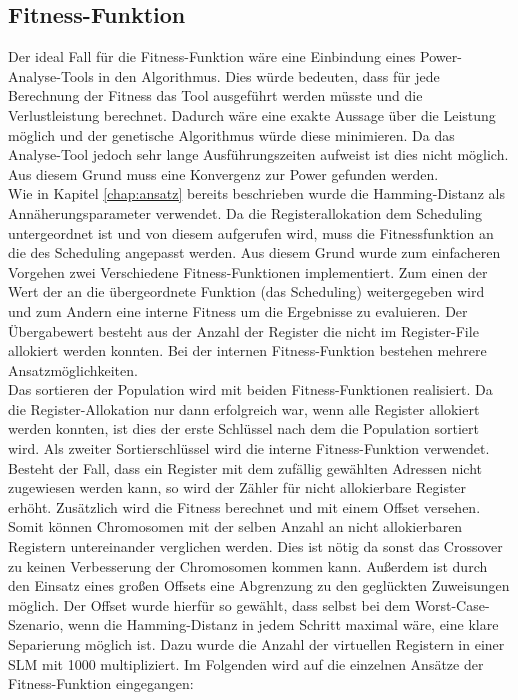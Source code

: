 \subsection{Fitness-Funktion}
\label{chap:Fitness-Funktion}
Der ideal Fall für die Fitness-Funktion wäre eine Einbindung eines Power-Analyse-Tools in den Algorithmus. Dies würde bedeuten, dass für jede Berechnung der Fitness das Tool ausgeführt werden müsste und die Verlustleistung berechnet. Dadurch wäre eine exakte Aussage über die Leistung möglich und der genetische Algorithmus würde diese minimieren. Da das Analyse-Tool jedoch sehr lange Ausführungszeiten aufweist ist dies nicht möglich. Aus diesem Grund muss eine Konvergenz zur Power gefunden werden.\\
Wie in Kapitel \ref{chap:ansatz} bereits beschrieben wurde die Hamming-Distanz als Annäherungsparameter verwendet. Da die Registerallokation dem Scheduling untergeordnet ist und von diesem aufgerufen wird, muss die Fitnessfunktion an die des Scheduling angepasst werden. Aus diesem Grund wurde zum einfacheren Vorgehen zwei Verschiedene Fitness-Funktionen implementiert. Zum einen der Wert der an die übergeordnete Funktion (das Scheduling) weitergegeben wird und zum Andern eine interne Fitness um die Ergebnisse zu evaluieren.
Der Übergabewert besteht aus der Anzahl der Register die nicht im Register-File allokiert werden konnten. Bei der internen Fitness-Funktion bestehen mehrere Ansatzmöglichkeiten.\\
Das sortieren der Population wird mit beiden Fitness-Funktionen realisiert. Da die Register-Allokation nur dann erfolgreich war, wenn alle Register allokiert werden konnten, ist dies der erste Schlüssel nach dem die Population sortiert wird. Als zweiter Sortierschlüssel wird die interne Fitness-Funktion verwendet.
Besteht der Fall, dass ein Register mit dem zufällig gewählten Adressen nicht zugewiesen werden kann, so wird der Zähler für nicht allokierbare Register erhöht. Zusätzlich wird die Fitness berechnet und mit einem Offset versehen. Somit können Chromosomen mit der selben Anzahl an nicht allokierbaren Registern untereinander verglichen werden. Dies ist nötig da sonst das Crossover zu keinen Verbesserung der Chromosomen kommen kann. Außerdem ist durch den Einsatz eines großen Offsets eine Abgrenzung zu den geglückten Zuweisungen möglich. Der Offset wurde hierfür  so gewählt, dass selbst bei dem Worst-Case-Szenario, wenn die Hamming-Distanz in jedem Schritt maximal wäre, eine klare Separierung möglich ist. Dazu wurde die Anzahl der virtuellen Registern in einer SLM mit 1000 multipliziert.
Im Folgenden wird auf die einzelnen Ansätze der Fitness-Funktion eingegangen:


